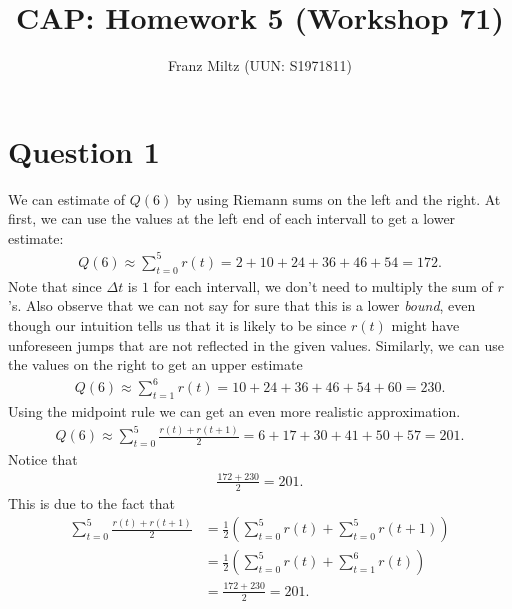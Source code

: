 \documentclass{article}
\title{CAP: Homework 5 (Workshop 71)}
\author{Franz Miltz (UUN: S1971811)}
\begin{document}
\maketitle
\section*{Question 1}
We can estimate of $Q(6)$ by using Riemann sums on the left and the right.
At first, we can use the values at the left end of each intervall to get a lower estimate:
\begin{align*}
	Q(6) \approx \sum_{t=0}^5 r(t)=2 + 10 + 24 +36 + 46+54=172.
\end{align*}
Note that since $\Delta t$ is $1$ for each intervall, we don't need to multiply the sum of $r$'s.
Also observe that we can not say for sure that this is a lower \emph{bound}, even though our intuition tells us that it is likely to be since $r(t)$ might have unforeseen jumps that are not reflected in the given values.
Similarly, we can use the values on the right to get an upper estimate
\begin{align*}
	Q(6) \approx \sum_{t=1}^6 r(t)=10+24+36+46+54+60=230.
\end{align*}
Using the midpoint rule we can get an even more realistic approximation.
\begin{align*}
	Q(6)\approx \sum_{t=0}^5 \frac{r(t)+r(t+1)}{2}=6+17+30+41+50+57=201.
\end{align*}
Notice that
\begin{align*}
	\frac{172+230}{2}=201.
\end{align*}
This is due to the fact that
\begin{align*}
	\sum_{t=0}^5\frac{r(t)+r(t+1)}{2}
	 & =\frac{1}{2}\left(\sum_{t=0}^5 r(t)+\sum_{t=0}^5 r(t+1)\right) \\
	 & =\frac{1}{2}\left(\sum_{t=0}^5 r(t)+\sum_{t=1}^6 r(t)\right)   \\
	 & =\frac{172+230}{2}=201.
\end{align*}
\end{document}
